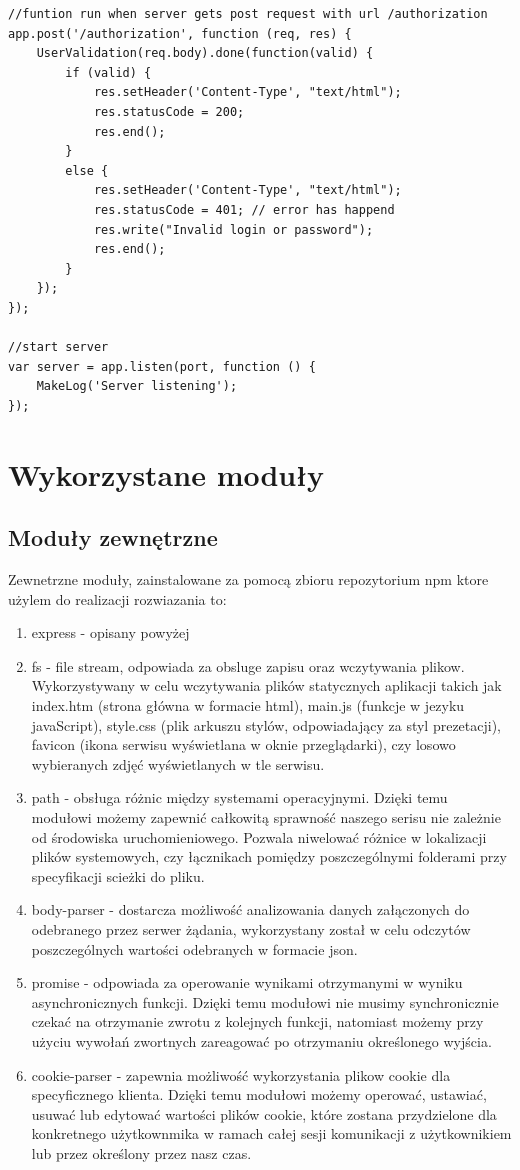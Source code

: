 \documentclass[12pt]{report}
\begin{document}
\begin{lstlisting}[caption=My Javascript Example]
//funtion run when server gets post request with url /authorization
app.post('/authorization', function (req, res) {
	UserValidation(req.body).done(function(valid) {
	    if (valid) {
	  	    res.setHeader('Content-Type', "text/html");
			res.statusCode = 200;
			res.end();
	   	}
        else {
            res.setHeader('Content-Type', "text/html");
			res.statusCode = 401; // error has happend
			res.write("Invalid login or password");
			res.end();
		}
    });
});

//start server
var server = app.listen(port, function () {
	MakeLog('Server listening');
});
\end{lstlisting}

\section{Wykorzystane moduły}

\subsection{Moduły zewnętrzne}
Zewnetrzne moduły, zainstalowane za pomocą zbioru repozytorium npm ktore użylem do realizacji rozwiazania to:
\begin{enumerate}
\item express - opisany powyżej
\item fs - file stream, odpowiada za obsluge zapisu oraz wczytywania plikow. 
Wykorzystywany w celu wczytywania plików statycznych aplikacji takich jak index.htm (strona główna w formacie html), main.js (funkcje w jezyku javaScript), style.css (plik arkuszu stylów, odpowiadający za styl prezetacji), favicon (ikona serwisu wyświetlana w oknie przeglądarki), czy losowo wybieranych zdjęć wyświetlanych w tle serwisu.
\item path - obsługa różnic między systemami operacyjnymi. 
Dzięki temu modułowi możemy zapewnić całkowitą sprawność naszego serisu nie zależnie od środowiska uruchomieniowego. 
Pozwala niwelować różnice w lokalizacji plików systemowych, czy łącznikach pomiędzy poszczególnymi folderami przy specyfikacji scieżki do pliku.
\item body-parser - dostarcza możliwość analizowania danych załączonych do odebranego przez serwer żądania, wykorzystany został w celu odczytów poszczególnych wartości odebranych w formacie json.
\item promise - odpowiada za operowanie wynikami otrzymanymi w wyniku asynchronicznych funkcji. 
Dzięki temu modułowi nie musimy synchronicznie czekać na otrzymanie zwrotu z kolejnych funkcji, natomiast możemy przy użyciu wywołań zwortnych zareagować po otrzymaniu określonego wyjścia.
\item cookie-parser - zapewnia możliwość wykorzystania plikow cookie dla specyficznego klienta. 
Dzięki temu modułowi możemy operować, ustawiać, usuwać lub edytować wartości plików cookie, które zostana przydzielone dla konkretnego użytkownmika w ramach całej sesji komunikacji z użytkownikiem lub przez określony przez nasz czas. 
\end{enumerate}
\end{document}
